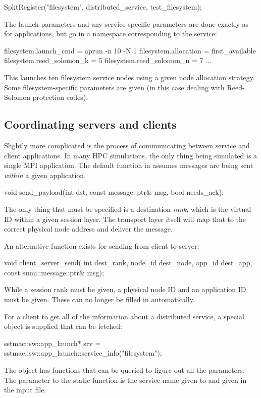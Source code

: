 \begin{CppCode}
SpktRegister("filesystem", distributed_service, test_filesystem);
\end{CppCode}
The launch parameters and any service-specific parameters are done exactly as for applications, but go in a namespace corresponding to the service:

\begin{ViFile}
filesystem.launch_cmd = aprun -n 10 -N 1
filesystem.allocation = first_available
filesystem.reed_solomon_k = 5
filesystem.reed_solomon_n = 7
...
\end{ViFile}
This launches ten filesystem service nodes using a given node allocation strategy.
Some filesystem-specific parameters are given (in this case dealing with Reed-Solomon protection codes).

\subsection{Coordinating servers and clients}
Slightly more complicated is the process of communicating between service and client applications.
In many HPC simulations, the only thing being simulated is a single MPI application.
The default  function in  assumes messages are being sent \emph{within} a given application.

\begin{CppCode}
void
send_payload(int dst, 
  const message::ptr& msg, 
  bool needs_ack);
\end{CppCode}
The only thing that must be specified is a destination \emph{rank}, which is the virtual ID within a given session layer.
The transport layer itself will map that to the correct physical node address and deliver the message.

An alternative function exists for sending from client to server:

\begin{CppCode}
void client_server_send(
  int dest_rank,
  node_id dest_node,
  app_id dest_app,
  const sumi::message::ptr& msg);
\end{CppCode}
While a session rank must be given, a physical node ID and an application ID must be given.
These can no longer be filled in automatically.

For a client to get all of the information about a distributed service, a special object is supplied that can be fetched:

\begin{CppCode}
sstmac::sw::app_launch* srv = sstmac::sw::app_launch::service_info("filesystem");
\end{CppCode}
The object  has functions that can be queried to figure out all the  parameters.  
The parameter to the static  function is the service name given to  and given in the input file.

